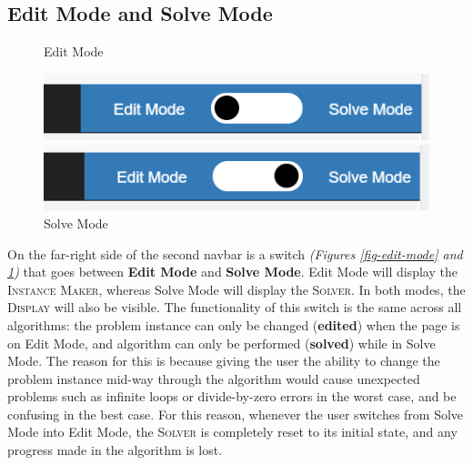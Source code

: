 \subsection{Edit Mode and Solve Mode}
\begin{figure}[h]
  \caption{Edit Mode}
  \label{fig-edit-mode}
  \includegraphics[]{images/reusable-components/edit-mode.png}
  \centering
  \caption{Solve Mode}
  \label{fig-solve-mode}
  \includegraphics[]{images/reusable-components/solve-mode.png}
  \centering
\end{figure}
On the far-right side of the second navbar is a switch 
\textit{(Figures \ref{fig-edit-mode} and \ref{fig-solve-mode})} 
that goes between \textbf{Edit Mode} and \textbf{Solve Mode}. 
Edit Mode will display the \textsc{Instance Maker},
whereas Solve Mode will display the \textsc{Solver}. 
In both modes, the \textsc{Display} will also be visible. 
\newline\newline
The functionality of this switch  is the same across all algorithms:
the problem instance can only be changed (\textbf{edited}) when the page is on Edit Mode, 
and algorithm can only be performed (\textbf{solved}) while in Solve Mode. 
The reason for this is because giving the user the ability to change the 
problem instance mid-way through the algorithm would cause unexpected problems
such as infinite loops or divide-by-zero errors in the worst case, and be 
confusing in the best case. 
For this reason, whenever the user switches from Solve Mode into Edit Mode, 
the \textsc{Solver} is completely reset to its initial state, and any progress
made in the algorithm is lost.
